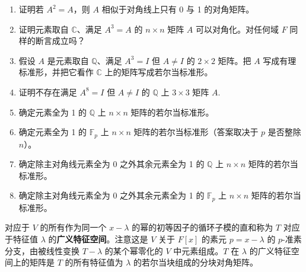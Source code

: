\begin{enumerate}
\item 证明若 \(A^2 = A\)，则 \(A\) 相似于对角线上只有 0 与 1 的对角矩阵。

\item 证明元素取自 \(\mathbb{C}\)、满足 \(A^3 = A\) 的 \(n \times n\) 矩阵 \(A\) 可以对角化。对任何域 \(F\) 同样的断言成立吗？

\item 假设 \(A\) 是元素取自 \(\mathbb{Q}\)、满足 \(A^3 = I\) 但 \(A \neq I\) 的 \(2 \times 2\) 矩阵。把 \(A\) 写成有理标准形，并把它看作 \(\mathbb{C}\) 上的矩阵写成若尔当标准形。

\item 证明不存在满足 \(A^8 = I\) 但 \(A \neq I\) 的 \(\mathbb{Q}\) 上 \(3 \times 3\) 矩阵 \(A\).

\item 确定元素全为 1 的 \(\mathbb{Q}\) 上 \(n \times n\) 矩阵的若尔当标准形。

\item 确定元素全为 1 的 \(\mathbb{F}_p\) 上 \(n \times n\) 矩阵的若尔当标准形（答案取决于 \(p\) 是否整除 \(n\)）。

\item 确定除主对角线元素全为 0 之外其余元素全为 1 的 \(\mathbb{Q}\) 上 \(n \times n\) 矩阵的若尔当标准形。

\item 确定除主对角线元素全为 0 之外其余元素全为 1 的 \(\mathbb{F}_p\) 上 \(n \times n\) 矩阵的若尔当标准形。
\end{enumerate}

\noindent 对应于 \(V\) 的所有作为同一个 \(x-\lambda\) 的幂的初等因子的循环子模的直和称为 \(T\) 对应于特征值 \(\lambda\) 的\textbf{广义特征空间}。注意这是 \(V\) 关于 \(F[x]\) 的素元 \(p = x-\lambda\) 的 \(p\)-准素分支，由被线性变换 \(T-\lambda\) 的某个幂零化的 \(V\) 中元素组成。\(T\) 在 \(\lambda\) 的广义特征空间上的矩阵是 \(T\) 的所有特征值为 \(\lambda\) 的若尔当块组成的分块对角矩阵。

